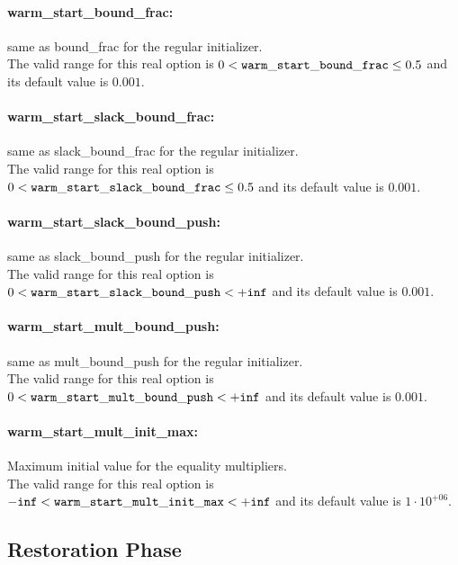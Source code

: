 \paragraph{warm\_start\_bound\_frac:}\label{sec:warm_start_bound_frac} same as bound\_frac for the regular initializer. $\;$ \\
 The valid range for this real option is 
$0 <  {\tt warm\_start\_bound\_frac } \le 0.5$
and its default value is $0.001$.


\paragraph{warm\_start\_slack\_bound\_frac:}\label{sec:warm_start_slack_bound_frac} same as slack\_bound\_frac for the regular initializer. $\;$ \\
 The valid range for this real option is 
$0 <  {\tt warm\_start\_slack\_bound\_frac } \le 0.5$
and its default value is $0.001$.


\paragraph{warm\_start\_slack\_bound\_push:}\label{sec:warm_start_slack_bound_push} same as slack\_bound\_push for the regular initializer. $\;$ \\
 The valid range for this real option is 
$0 <  {\tt warm\_start\_slack\_bound\_push } <  {\tt +inf}$
and its default value is $0.001$.


\paragraph{warm\_start\_mult\_bound\_push:}\label{sec:warm_start_mult_bound_push} same as mult\_bound\_push for the regular initializer. $\;$ \\
 The valid range for this real option is 
$0 <  {\tt warm\_start\_mult\_bound\_push } <  {\tt +inf}$
and its default value is $0.001$.


\paragraph{warm\_start\_mult\_init\_max:}\label{sec:warm_start_mult_init_max} Maximum initial value for the equality multipliers. $\;$ \\
 The valid range for this real option is 
${\tt -inf} <  {\tt warm\_start\_mult\_init\_max } <  {\tt +inf}$
and its default value is $1 \cdot 10^{+06}$.


\subsection{Restoration Phase}

